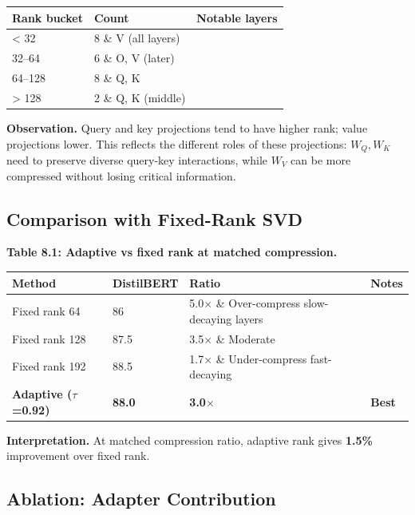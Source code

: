 \begin{table}[H]
\centering
\small
\begin{tabular}{lll}
\toprule
\textbf{Rank bucket} & \textbf{Count} & \textbf{Notable layers} \\
\midrule
\textless{} 32 & 8 \& V (all layers) \\
32--64 & 6 \& O, V (later) \\
64--128 & 8 \& Q, K \\
\textgreater{} 128 & 2 \& Q, K (middle) \\
\bottomrule
\end{tabular}
\end{table}

\textbf{Observation.} Query and key projections tend to have higher rank; value 
projections lower. This reflects the different roles of these projections: 
$W_Q, W_K$ need to preserve diverse query-key interactions, while $W_V$ can 
be more compressed without losing critical information.

\subsection{Comparison with Fixed-Rank SVD}

\textbf{Table 8.1: Adaptive vs fixed rank at matched compression.}

\begin{table}[H]
\centering
\small
\begin{tabular}{llll}
\toprule
\textbf{Method} & \textbf{DistilBERT} & \textbf{Ratio} & \textbf{Notes} \\
\midrule
Fixed rank 64 & 86 & 5.0$\times$ \& Over-compress slow-decaying layers \\
Fixed rank 128 & 87.5 & 3.5$\times$ \& Moderate \\
Fixed rank 192 & 88.5 & 1.7$\times$ \& Under-compress fast-decaying \\
\textbf{Adaptive ($\tau$=0.92)} & \textbf{88.0} & \textbf{3.0$\times$} & \textbf{Best} \\
\bottomrule
\end{tabular}
\end{table}

\textbf{Interpretation.} At matched compression ratio, adaptive rank gives 
\textbf{1.5\%} improvement over fixed rank.

\subsection{Ablation: Adapter Contribution}


